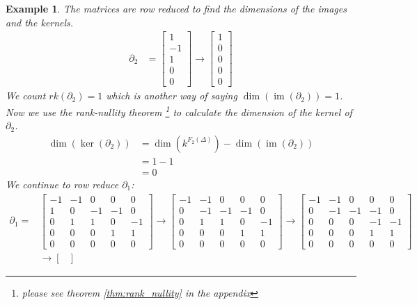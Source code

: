 \documentclass[11pt,a4paper,twoside]{report}
\newtheorem{myex}[mythm]{Example}
\DeclareMathOperator{\im}{im}
\begin{document}
\begin{myex}
The matrices are row reduced to find the dimensions of the images and the kernels.
\begin{align*}
\partial_2&= 
\begin{bmatrix}
1\\
-1\\
1\\
0\\
0
\end{bmatrix}
\to
\begin{bmatrix}
1\\
0\\
0\\
0\\
0
\end{bmatrix}
\end{align*}
We count $rk(\partial_2)=1$ which is another way of saying $\dim(\im(\partial_2))=1$. Now we use the rank-nullity theorem \footnote{please see theorem \ref{thm:rank_nullity} in the appendix} to calculate the dimension of the kernel of $\partial_2$.
\begin{align*}
\dim(\ker(\partial_2))&=\dim(k^{F_2(\Delta)})-\dim(\im(\partial_2))\\
&=1-1\\
&= 0
\end{align*}
We continue to row reduce $\partial_1$:
\begin{align*}
\partial_1=&
\begin{bmatrix}
-1 & -1 & 0 & 0 & 0\\
1 & 0 & -1 & -1 & 0\\
0 & 1 & 1 & 0 & -1\\
0 & 0 & 0 & 1 & 1\\
0 & 0 & 0 & 0 & 0
\end{bmatrix}
\to
\begin{bmatrix}
-1 & -1 & 0 & 0 & 0\\
0 & -1 & -1 & -1 & 0\\
0 & 1 & 1 & 0 & -1\\
0 & 0 & 0 & 1 & 1\\
0 & 0 & 0 & 0 & 0
\end{bmatrix}
\to
\begin{bmatrix}
-1 & -1 & 0 & 0 & 0\\
0 & -1 & -1 & -1 & 0\\
0 & 0 & 0 & -1 & -1\\
0 & 0 & 0 & 1 & 1\\
0 & 0 & 0 & 0 & 0
\end{bmatrix}\\
&\to
\begin{bmatrix}

\end{bmatrix}
\end{align*}
\end{myex}
\end{document}
